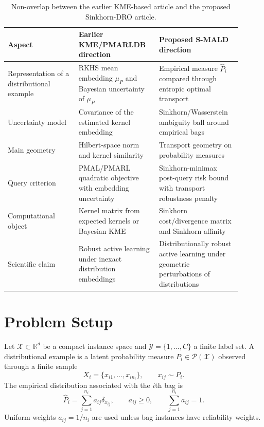 \documentclass[11pt,a4paper]{article}
\newcommand{\R}{\mathbb{R}}
\newcommand{\cY}{\mathcal{Y}}
\newcommand{\cX}{\mathcal{X}}
\newcommand{\cP}{\mathcal{P}}
\begin{document}
\begin{table}[t]
\centering
\caption{Non-overlap between the earlier KME-based article and the proposed Sinkhorn-DRO article.}
\label{tab:novelty}
\begin{tabular}{p{0.28\linewidth}p{0.31\linewidth}p{0.31\linewidth}}
\toprule
Aspect & Earlier KME/PMARLDB direction & Proposed S-MALD direction \\
\midrule
Representation of a distributional example & RKHS mean embedding $\mu_P$ and Bayesian uncertainty of $\mu_P$ & Empirical measure $\widehat P_i$ compared through entropic optimal transport \\
Uncertainty model & Covariance of the estimated kernel embedding & Sinkhorn/Wasserstein ambiguity ball around empirical bags \\
Main geometry & Hilbert-space norm and kernel similarity & Transport geometry on probability measures \\
Query criterion & PMAL/PMARL quadratic objective with embedding uncertainty & Sinkhorn-minimax post-query risk bound with transport robustness penalty \\
Computational object & Kernel matrix from expected kernels or Bayesian KME & Sinkhorn cost/divergence matrix and Sinkhorn affinity \\
Scientific claim & Robust active learning under inexact distribution embeddings & Distributionally robust active learning under geometric perturbations of distributions \\
\bottomrule
\end{tabular}
\end{table}

\section{Problem Setup}

Let $\cX\subset\R^d$ be a compact instance space and $\cY=\{1,\ldots,C\}$ a finite label set. A distributional example is a latent probability measure $P_i\in\cP(\cX)$ observed through a finite sample
\[
X_i=\{x_{i1},\ldots,x_{in_i}\},\qquad x_{ij}\sim P_i.
\]
The empirical distribution associated with the $i$th bag is
\begin{equation}
\widehat P_i = \sum_{j=1}^{n_i} a_{ij}\delta_{x_{ij}},
\qquad a_{ij}\ge 0,
\qquad \sum_{j=1}^{n_i}a_{ij}=1.
\label{eq:empirical-bag}
\end{equation}
Uniform weights $a_{ij}=1/n_i$ are used unless bag instances have reliability weights.
\end{document}
